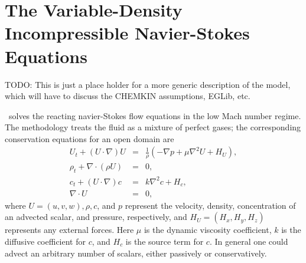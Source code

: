 \section{The Variable-Density Incompressible Navier-Stokes Equations}

TODO: This is just a place holder for a more generic description of the model, which will have to 
discuss the CHEMKIN assumptions, EGLib, etc.

\newcommand{\etal}{{\it et al.}}

\iamr\ solves the reacting navier-Stokes flow equations in the low Mach number regime.
The methodology treats the
fluid as a mixture of perfect gases; the corresponding conservation
equations for an open domain are
\begin{eqnarray}
U_t + (U\cdot\nabla)U &=& \frac{1}{\rho}(-\nabla p + \mu\nabla^2 U + H_U), \\
\rho_t + \nabla\cdot(\rho U) &=& 0, \\
c_t + (U\cdot\nabla)c &=& k\nabla^2 c + H_c, \\
\nabla\cdot U &=& 0,
\end{eqnarray}
where $U = (u, v, w), \rho, c$, and $p$ represent the velocity, density, concentration of an 
advected scalar, and pressure, respectively, and $H_U = (H_x , H_y , H_z )$ represents any external
forces. Here $\mu$ is the dynamic viscosity coefficient, $k$ is the diffusive coefficient for $c$, and
$H_c$ is the source term for $c$. In general one could advect an arbitrary number of scalars,
either passively or conservatively.
